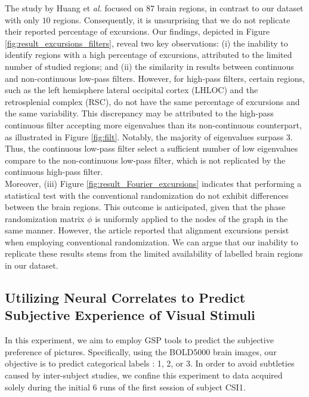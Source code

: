 The study by Huang et \textit{al.} \cite{huang_graph_2018} focused on $87$ brain regions, in contrast to our dataset with only $10$ regions. Consequently, it is unsurprising that we do not replicate their reported percentage of excursions. Our findings, depicted in Figure \ref{fig:result_excursions_filters}, reveal two key observations: (i) the inability to identify regions with a high percentage of excursions, attributed to the limited number of studied regions; and (ii) the similarity in results between continuous and non-continuous low-pass filters. However, for high-pass filters, certain regions, such as the left hemisphere lateral occipital cortex (LHLOC) and the retrosplenial complex (RSC), do not have the same percentage of excursions and the same variability. This discrepancy may be attributed to the high-pass continuous filter accepting more eigenvalues than its non-continuous counterpart,  as illustrated in Figure \ref{fig:filt}. Notably, the majority of eigenvalues surpass $3$. Thus, the continuous low-pass filter select a sufficient number of low eigenvalues compare to the non-continuous low-pass filter, which is not replicated by the continuous high-pass filter.\\
Moreover, (iii) Figure \ref{fig:result_Fourier_excursions} indicates that performing a statistical test with the conventional randomization do not exhibit differences between the brain regions. This outcome is anticipated, given that the phase randomization matrix $\phi$ is uniformly applied to the nodes of the graph in the same manner. However, the article \cite{huang_graph_2018} reported that alignment excursions persist when employing conventional randomization.
We can argue that our inability to replicate these results stems from the limited availability of labelled brain regions in our dataset.

\subsection{Utilizing Neural Correlates to Predict Subjective Experience of Visual Stimuli}\label{subsec:classification_results}

In this experiment, we aim to employ GSP tools to predict the subjective preference of pictures. Specifically, using the BOLD5000 brain images, our objective is to predict categorical labels : 1, 2, or 3. In order to avoid subtleties caused by inter-subject studies, we confine this experiment to data acquired solely during the initial 6 runs of the first session of subject CSI1.

